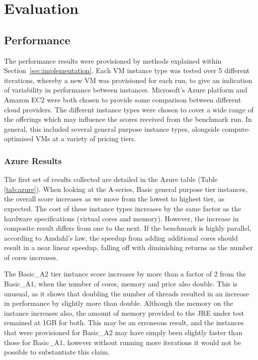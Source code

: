 \documentclass{llncs}
\begin{document}

\section{Evaluation}

\subsection{Performance}\label{sec:eval:performance}

The performance results were provisioned by methods explained within Section~\ref{sec:implementation}. Each VM instance type was tested over 5 different iterations, whereby a new VM was provisioned for each run, to give an indication of variability in performance between instances. Microsoft's Azure platform and Amazon EC2 were both chosen to provide some comparison between different cloud providers. The different instance types were chosen to cover a wide range of the offerings which may influence the scores received from the benchmark run. In general, this included several general purpose instance types, alongside compute-optimised VMs at a variety of pricing tiers.

\subsubsection{Azure Results}\label{sec:eval:azureresults}

The first set of results collected are detailed in the Azure table (Table \ref{tab:azure}). When looking at the A-series, Basic general purpose tier instances, the overall score increases as we move from the lowest to highest tier, as expected. The cost of these instance types increases by the same factor as the hardware specifications (virtual cores and memory). However, the increase in composite result differs from one to the next. If the benchmark is highly parallel, according to Amdahl's law, the speedup from adding additional cores should result in a near linear speedup, falling off with diminishing returns as the number of cores increases.

The Basic\_A2 tier instance score increases by more than a factor of 2 from the Basic\_A1, when the number of cores, memory and price also double. This is unusual, as it shows that doubling the number of threads resulted in an increase in performance by slightly more than double. Although the memory on the instance increases also, the amount of memory provided to the JRE under test remained at 1GB for both. This may be an erroneous result, and the instances that were provisioned for Basic\_A2 may have simply been slightly faster than those for Basic\_A1, however without running more iterations it would not be possible to substantiate this claim.
\end{document}
